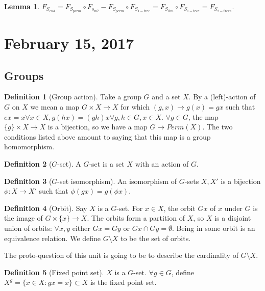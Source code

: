 \documentclass[12pt]{article}
\theoremstyle{definition}
\newtheorem{defn}{Definition}
\newtheorem{lemma}[theorem]{Lemma}
\begin{document}
\begin{lemma}
    $F_{S_{end}} = F_{S_{perm}} \circ F_{s_{nil}} - F_{S_{perm}} \circ
    F_{S_{1-tree}} = F_{S_{lim}} \circ F_{S_{1-tree}} = F_{S_{2-trees}}$.
\end{lemma}

\section{February 15, 2017}

\subsection{Groups}

\begin{defn}[Group action]
    Take a group $G$ and a set $X$. By a (left)-action of $G$ on $X$ we mean a
    map $G \times X \rightarrow X$ for which $(g, x) \rightarrow g(x) = gx$
    such that $ex =x \forall x \in X, g(hx) = (gh)x \forall g, h \in G, x \in
    X$. $\forall g \in G$, the map $\{g\} \times X \rightarrow X$ is a
    bijection, so we have a map $G \rightarrow Perm(X)$. The two conditions
    listed above amount to saying that this map is a group homomorphism.
\end{defn}

\begin{defn}[$G$-set]
    A $G$-set is a set $X$ with an action of $G$.
\end{defn}

\begin{defn}[$G$-set isomorphism]
    An isomorphism of $G$-sets $X, X'$ is a bijection $\phi: X \rightarrow X'$
    such that $\phi(gx) = g(\phi x)$.
\end{defn}

\begin{defn}[Orbit]
    Say $X$ is a $G$-set. For $x \in X$, the orbit $Gx$ of $x$ under $G$ is the
    image of $G \times \{x\} \rightarrow X$. The orbits form a partition of
    $X$, so $X$ is a disjoint union of orbits: $\forall x, y$ either $Gx = Gy$
    or $Gx \cap Gy = \emptyset$. Being in some orbit is an equivalence
    relation. We define $G \setminus X$ to be the set of orbits.

    The proto-question of this unit is going to be to describe the cardinality
    of $G \setminus X$.
\end{defn}

\begin{defn}[Fixed point set]
    $X$ is a $G$-set. $\forall g \in G$, define $X^g = \{x \in X : gx = x\}
    \subset X$ is the fixed point set.
\end{defn}
\end{document}
